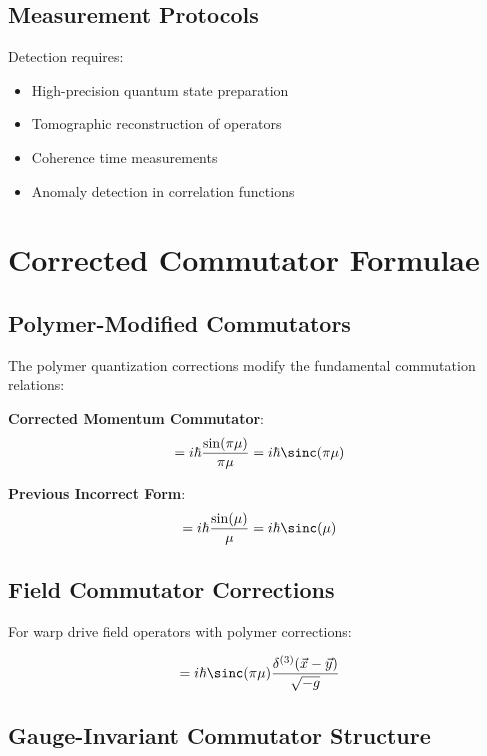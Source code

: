 \documentclass[12pt,a4paper]{article}
\begin{document}
\subsection{Measurement Protocols}

Detection requires:

\begin{itemize}
\item High-precision quantum state preparation
\item Tomographic reconstruction of operators
\item Coherence time measurements
\item Anomaly detection in correlation functions
\end{itemize}

\section{Corrected Commutator Formulae}

\subsection{Polymer-Modified Commutators}

The polymer quantization corrections modify the fundamental commutation relations:

\textbf{Corrected Momentum Commutator}:
\begin{equation}
[\hat{x}, \hat{p}_{\text{polymer}}] = i\hbar \frac{\sin(\pi\mu)}{\pi\mu} = i\hbar \sinc(\pi\mu)
\end{equation}

\textbf{Previous Incorrect Form}:
\begin{equation}
[\hat{x}, \hat{p}_{\text{naive}}] = i\hbar \frac{\sin(\mu)}{\mu} = i\hbar \sinc(\mu)
\end{equation}

\subsection{Field Commutator Corrections}

For warp drive field operators with polymer corrections:

\begin{equation}
[\hat{\phi}(x), \hat{\pi}_{\text{polymer}}(y)] = i\hbar \sinc(\pi\mu) \frac{\delta^{(3)}(\vec{x} - \vec{y})}{\sqrt{-g}}
\end{equation}

\subsection{Gauge-Invariant Commutator Structure}
\end{document}
